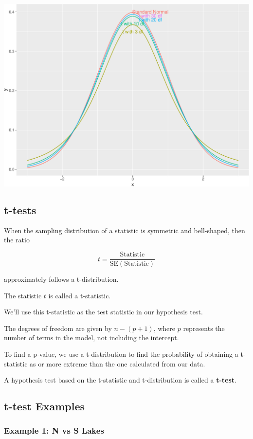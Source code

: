 \documentclass[
  letterpaper,
  DIV=11,
  numbers=noendperiod]{scrreprt}
\begin{document}
\includegraphics{Ch4_files/figure-pdf/unnamed-chunk-36-1.pdf}

\subsection{t-tests}\label{t-tests-1}

When the sampling distribution of a statistic is symmetric and
bell-shaped, then the ratio

\[
t= \frac{{\text{Statistic}}}{\text{SE}(\text{Statistic})}  
\]

approximately follows a t-distribution.

The statistic \(t\) is called a t-statistic.

We'll use this t-statistic as the test statistic in our hypothesis test.

The degrees of freedom are given by \(n-(p+1)\), where \(p\) represents
the number of terms in the model, not including the intercept.

To find a p-value, we use a t-distribution to find the probability of
obtaining a t-statistic as or more extreme than the one calculated from
our data.

A hypothesis test based on the t-statistic and t-distribution is called
a \textbf{t-test}.

\subsection{t-test Examples}\label{t-test-examples}

\subsubsection{Example 1: N vs S Lakes}\label{example-1-n-vs-s-lakes}
\end{document}

